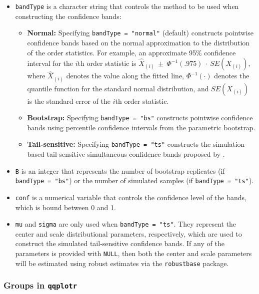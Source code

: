 \begin{itemize}
\item
  \texttt{bandType} is a character string that controls the method to be
  used when constructing the confidence bands:

  \begin{itemize}
  \tightlist
  \item
    \textbf{Normal:} Specifying \texttt{bandType\ =\ "normal"} (default)
    constructs pointwise confidence bands based on the normal
    approximation to the distribution of the order statistics. For
    example, an approximate 95\% confidence interval for the \(i\)th
    order statistic is
    \(\widehat{X}_{(i)}~\pm~\Phi^{-1}(.975)~\cdot~SE(X_{(i)})\), where
    \(\widehat{X}_{(i)}\) denotes the value along the fitted line,
    \(\Phi^{-1}(\cdot)\) denotes the quantile function for the standard
    normal distribution, and \(SE(X_{(i)})\) is the standard error of
    the \(i\)th order statistic.
  \item
    \textbf{Bootstrap:} Specifying \texttt{bandType\ =\ "bs"} constructs
    pointwise confidence bands using percentile confidence intervals
    from the parametric bootstrap.
  \item
    \textbf{Tail-sensitive:} Specifying \texttt{bandType\ =\ "ts"}
    constructs the simulation-based tail-sensitive simultaneous
    confidence bands proposed by \citet{Aldor-Noiman2013-xw}.
  \end{itemize}
\item
  \texttt{B} is an integer that represents the number of bootstrap
  replicates (if \texttt{bandType\ =\ "bs"}) or the number of simulated
  samples (if \texttt{bandType\ =\ "ts"}).
\item
  \texttt{conf} is a numerical variable that controls the confidence
  level of the bands, which is bound between 0 and 1.
\item
  \texttt{mu} and \texttt{sigma} are only used when
  \texttt{bandType\ =\ "ts"}. They represent the center and scale
  distributional parameters, respectively, which are used to construct
  the simulated tail-sensitive confidence bands. If any of the
  parameters is provided with \texttt{NULL}, then both the center and
  scale parameters will be estimated using robust estimates via the
  \texttt{robustbase} package.
\end{itemize}

\subsubsection{\texorpdfstring{Groups in
\texttt{qqplotr}}{Groups in qqplotr}}\label{groups-in-qqplotr}

